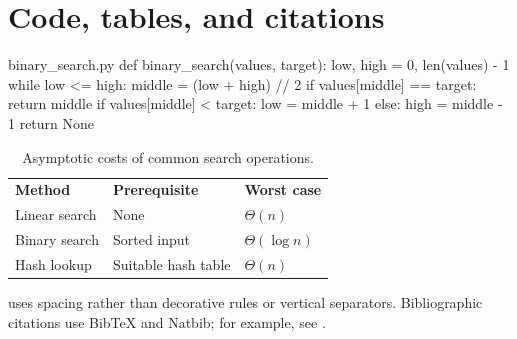 \section{Code, tables, and citations}

\begin{codebox}[python]{binary_search.py}
def binary_search(values, target):
    low, high = 0, len(values) - 1
    while low <= high:
        middle = (low + high) // 2
        if values[middle] == target:
            return middle
        if values[middle] < target:
            low = middle + 1
        else:
            high = middle - 1
    return None
\end{codebox}

\par{}
\begin{table}[H]
  \centering
  \caption{Asymptotic costs of common search operations.}
  \label{tab:complexity}
  \begingroup
  \begin{tabular}{@{}lll@{}}
    \textbf{Method} & \textbf{Prerequisite} & \textbf{Worst case} \\[0.35em]
    Linear search & None & $\Theta(n)$ \\
    Binary search & Sorted input & $\Theta(\log n)$ \\
    Hash lookup & Suitable hash table & $\Theta(n)$ \\
  \end{tabular}
  \endgroup
\end{table}
\par{}

 uses spacing rather than decorative rules or vertical separators.
Bibliographic citations use BibTeX and Natbib; for example, see \citet{knuth1984literate}.
